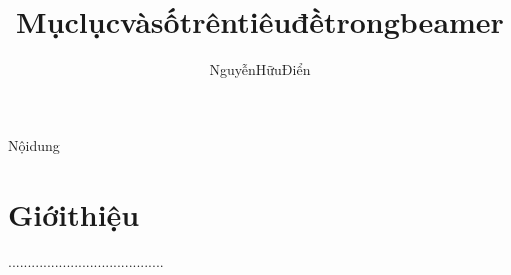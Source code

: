 \documentclass[unicode]{beamer}
\title[\textbf{Mụclụcvàsốtrêntiêuđềtrongbeamer}]{\textbf{Mụclụcvàsốtrêntiêuđềtrongbeamer}}
\author{NguyễnHữuĐiển}
\institute[ĐHKHTNHàNội]{\textbf{KhoaToán--Cơ--Tinhọc}\\
	\textbf{ĐạihọcĐHKHTN-ĐạihọcQuốcgiaHàNội}}
\date{}
\begin{document}
	\begin{frame}{Nộidung}
		\tableofcontents
	\end{frame}
	\section{Giớithiệu}
	........................................
\end{document}
